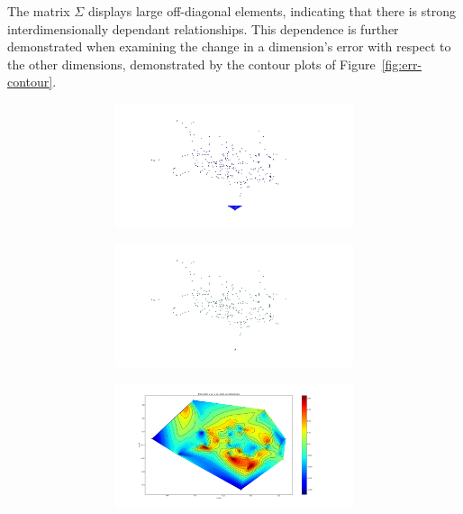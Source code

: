 The matrix $\Sigma$ displays large off-diagonal elements, indicating that there is strong interdimensionally dependant relationships. This dependence is further demonstrated when examining the change in a dimension's error with respect to the other dimensions, demonstrated by the contour plots of Figure~\ref{fig:err-contour}. 

\begin{figure}
  \centering
  \begin{subfigure}{0.48\textwidth}
    \begin{subfigure}{\textwidth}
      \includegraphics[clip, trim = 20 0 150 0, width=\textwidth]{figures/chapter3/contour_x}
    \end{subfigure}
    \begin{subfigure}{\textwidth}
      \includegraphics[clip, trim = 20 0 150 0, width=\textwidth]{figures/chapter3/contour_y}
    \end{subfigure}
    \begin{subfigure}{\textwidth}
      \includegraphics[clip, trim = 20 0 150 0, width=\textwidth]{figures/chapter3/contour_z}

\end{subfigure}
\end{subfigure}
\end{figure}
